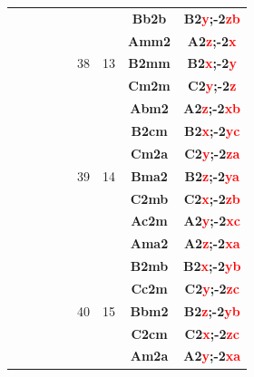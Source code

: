 \documentclass{article}      %
\begin{document}
\begin{small}
\begin{longtable}[c]{|c|c|c|c|c|c|c|c|c|}
          &  & & & &  & &\textbf{Bb2b}         &\textbf{B2\textcolor{red}{y};-2\textcolor{red}{zb}}\\\cline{6-9}          
          &  & & & &  & &\textbf{Amm2}         &\textbf{A2\textcolor{red}{z};-2\textcolor{red}{x}}\\\cline{8-9}           
	  &  & & & &\textrm{38}  &\textrm{13} &\textbf{B2mm}         &\textbf{B2\textcolor{red}{x};-2\textcolor{red}{y}}\\\cline{8-9}           
          &  & & & &  & &\textbf{Cm2m}         &\textbf{C2\textcolor{red}{y};-2\textcolor{red}{z}}\\\cline{6-9}           
          &  & & & &  & &\textbf{Abm2}         &\textbf{A2\textcolor{red}{z};-2\textcolor{red}{xb}}\\\cline{8-9}          
          &  & & & &  & &\textbf{B2cm}         &\textbf{B2\textcolor{red}{x};-2\textcolor{red}{yc}}\\\cline{8-9}          
          &  & & & &  & &\textbf{Cm2a}         &\textbf{C2\textcolor{red}{y};-2\textcolor{red}{za}}\\\cline{8-9}          
	  &  & & & &\textrm{39}  &\textrm{14} &\textbf{Bma2}         &\textbf{B2\textcolor{red}{z};-2\textcolor{red}{ya}}\\\cline{8-9}          
          &  & & & &  & &\textbf{C2mb}         &\textbf{C2\textcolor{red}{x};-2\textcolor{red}{zb}}\\\cline{8-9}          
          &  & & & &  & &\textbf{Ac2m}         &\textbf{A2\textcolor{red}{y};-2\textcolor{red}{xc}}\\\cline{6-9}          
          &  & & & &  & &\textbf{Ama2}         &\textbf{A2\textcolor{red}{z};-2\textcolor{red}{xa}}\\\cline{8-9}          
          &  & & & &  & &\textbf{B2mb}         &\textbf{B2\textcolor{red}{x};-2\textcolor{red}{yb}}\\\cline{8-9}          
          &  & & & &  & &\textbf{Cc2m}         &\textbf{C2\textcolor{red}{y};-2\textcolor{red}{zc}}\\\cline{8-9}          
	  &  & & & &\textrm{40}  &\textrm{15} &\textbf{Bbm2}         &\textbf{B2\textcolor{red}{z};-2\textcolor{red}{yb}}\\\cline{8-9}          
          &  & & & &  & &\textbf{C2cm}         &\textbf{C2\textcolor{red}{x};-2\textcolor{red}{zc}}\\\cline{8-9}          
          &  & & & &  & &\textbf{Am2a}         &\textbf{A2\textcolor{red}{y};-2\textcolor{red}{xa}}\\\cline{6-9}          

\end{longtable}
\end{small}
\end{document}
